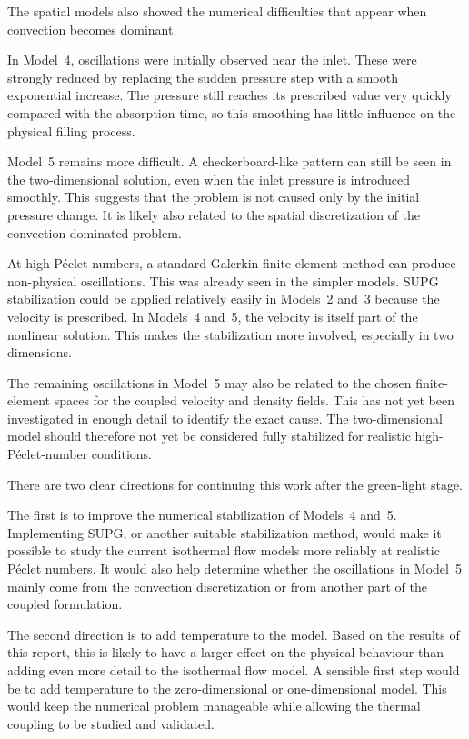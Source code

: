 The spatial models also showed the numerical difficulties that appear when convection becomes dominant.

In Model~4, oscillations were initially observed near the inlet. These were strongly reduced by replacing the sudden pressure step with a smooth exponential increase. The pressure still reaches its prescribed value very quickly compared with the absorption time, so this smoothing has little influence on the physical filling process.

Model~5 remains more difficult. A checkerboard-like pattern can still be seen in the two-dimensional solution, even when the inlet pressure is introduced smoothly. This suggests that the problem is not caused only by the initial pressure change. It is likely also related to the spatial discretization of the convection-dominated problem.

At high P\'eclet numbers, a standard Galerkin finite-element method can produce non-physical oscillations. This was already seen in the simpler models. SUPG stabilization could be applied relatively easily in Models~2 and~3 because the velocity is prescribed. In Models~4 and~5, the velocity is itself part of the nonlinear solution. This makes the stabilization more involved, especially in two dimensions.

The remaining oscillations in Model~5 may also be related to the chosen finite-element spaces for the coupled velocity and density fields. This has not yet been investigated in enough detail to identify the exact cause. The two-dimensional model should therefore not yet be considered fully stabilized for realistic high-P\'eclet-number conditions.

There are two clear directions for continuing this work after the green-light stage.

The first is to improve the numerical stabilization of Models~4 and~5. Implementing SUPG, or another suitable stabilization method, would make it possible to study the current isothermal flow models more reliably at realistic P\'eclet numbers. It would also help determine whether the oscillations in Model~5 mainly come from the convection discretization or from another part of the coupled formulation.

The second direction is to add temperature to the model. Based on the results of this report, this is likely to have a larger effect on the physical behaviour than adding even more detail to the isothermal flow model. A sensible first step would be to add temperature to the zero-dimensional or one-dimensional model. This would keep the numerical problem manageable while allowing the thermal coupling to be studied and validated.

